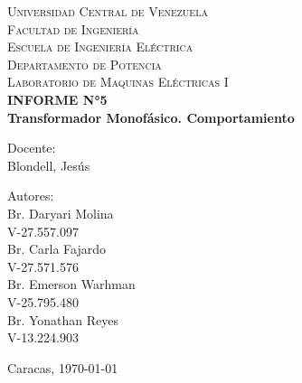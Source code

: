 \begin{titlepage}
    \begin{center}
        \textsc{ Universidad Central de Venezuela}\\
        \textsc{ Facultad de Ingeniería}\\
        \textsc{ Escuela de Ingeniería Eléctrica}\\
        \textsc{ Departamento de Potencia}\\
        \textsc{ Laboratorio de Maquinas Eléctricas I}\\[2cm]
        
        {\Large \bfseries INFORME N°5}\\[0.2cm]
        {\Large \bfseries Transformador Monofásico. Comportamiento}
        
        \vfill
        
        \begin{minipage}{0.4\textwidth}
            \begin{flushleft}
                {Docente:}\\
                Blondell, Jesús 
            \end{flushleft}
        \end{minipage}%
        \hfill
        \begin{minipage}{0.4\textwidth}
            \begin{flushright}
                {Autores:}\\
                Br. Daryari Molina\\
                V-27.557.097\\
                Br. Carla Fajardo\\
                V-27.571.576\\
                Br. Emerson Warhman\\
                V-25.795.480\\
                Br. Yonathan Reyes\\
                V-13.224.903
            \end{flushright}
        \end{minipage}
        
        \vfill
        
        { Caracas, \today} %
    \end{center}
\end{titlepage}